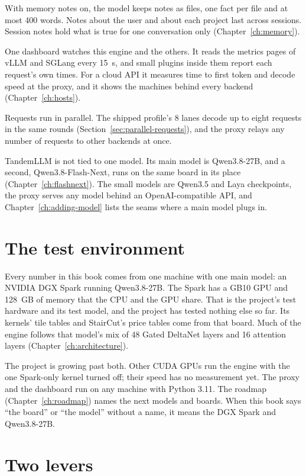 With memory notes on, the model keeps notes as files, one fact per file and at most 400 words. Notes about the user and about each project last across sessions. Session notes hold what is true for one conversation only (Chapter~\ref{ch:memory}).

One dashboard watches this engine and the others. It reads the metrics pages of vLLM and SGLang every 15~s, and small plugins inside them report each request's own times. For a cloud API it measures time to first token and decode speed at the proxy, and it shows the machines behind every backend (Chapter~\ref{ch:hosts}).

Requests run in parallel. The shipped profile's 8 lanes decode up to eight requests in the same rounds (Section~\ref{sec:parallel-requests}), and the proxy relays any number of requests to other backends at once.

TandemLLM is not tied to one model. Its main model is Qwen3.8-27B, and a second, Qwen3.8-Flash-Next, runs on the same board in its place (Chapter~\ref{ch:flashnext}). The small models are Qwen3.5 and Laya checkpoints, the proxy serves any model behind an OpenAI-compatible API, and Chapter~\ref{ch:adding-model} lists the seams where a main model plugs in.

\section{The test environment}\label{sec:test-env}

Every number in this book comes from one machine with one main model: an NVIDIA DGX Spark running Qwen3.8-27B. The Spark has a GB10 GPU and 128~GB of memory that the CPU and the GPU share. That is the project's test hardware and its test model, and the project has tested nothing else so far. Its kernels' tile tables and StairCut's price tables come from that board. Much of the engine follows that model's mix of 48 Gated DeltaNet layers and 16 attention layers (Chapter~\ref{ch:architecture}).

The project is growing past both. Other CUDA GPUs run the engine with the one Spark-only kernel turned off; their speed has no measurement yet. The proxy and the dashboard run on any machine with Python 3.11. The roadmap (Chapter~\ref{ch:roadmap}) names the next models and boards. When this book says \enquote{the board} or \enquote{the model} without a name, it means the DGX Spark and Qwen3.8-27B.

\section{Two levers}

